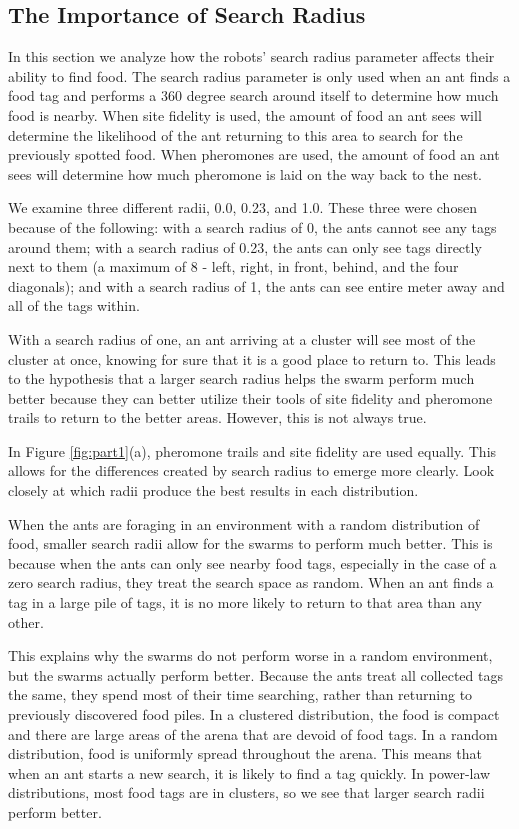 \documentclass{acm_proc_article-sp}
\begin{document}
\subsection{The Importance of Search Radius} \label{sec:part1}

In this section we analyze how the robots' search radius parameter affects their ability to find food. The search radius parameter is only used when an ant finds a food tag and performs a 360 degree search around itself to determine how much food is nearby. When site fidelity is used, the amount of food an ant sees will determine the likelihood of the ant returning to this area to search for the previously spotted food. When pheromones are used, the amount of food an ant sees will determine how much pheromone is laid on the way back to the nest.

We examine three different radii, 0.0, 0.23, and 1.0. These three were chosen because of the following: with a search radius of 0, the ants cannot see any tags around them; with a search radius of 0.23, the ants can only see tags directly next to them (a maximum of 8 - left, right, in front, behind, and the four diagonals); and with a search radius of 1, the ants can see entire meter away and all of the tags within.

With a search radius of one, an ant arriving at a cluster will see most of the cluster at once, knowing for sure that it is a good place to return to. This leads to the hypothesis that a larger search radius helps the swarm perform much better because they can better utilize their tools of site fidelity and pheromone trails to return to the better areas. However, this is not always true. 

In Figure \ref{fig:part1}(a), pheromone trails and site fidelity are used equally. This allows for the differences created by search radius to emerge more clearly. Look closely at which radii produce the best results in each distribution. 

When the ants are foraging in an environment with a random distribution of food, smaller search radii allow for the swarms to perform much better. This is because when the ants can only see nearby food tags, especially in the case of a zero search radius, they treat the search space as random. When an ant finds a tag in a large pile of tags, it is no more likely to return to that area than any other. 

This explains why the swarms do not perform worse in a random environment, but the swarms actually perform better. Because the ants treat all collected tags the same, they spend most of their time searching, rather than returning to previously discovered food piles. In a clustered distribution, the food is compact and there are large areas of the arena that are devoid of food tags. In a random distribution, food is uniformly spread throughout the arena. This means that when an ant starts a new search, it is likely to find a tag quickly. In power-law distributions, most food tags are in clusters, so we see that larger search radii perform better.
\end{document}
